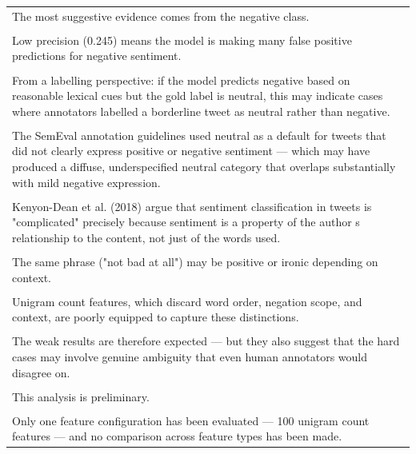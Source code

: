 \documentclass[11pt,a4paper,landscape]{article}
\begin{document}
\begin{longtable}{|p{\dimexpr\linewidth-2\tabcolsep-2\arrayrulewidth\relax}|}
\hline
\rule{0pt}{3.5cm} \\
\hline
The most suggestive evidence comes from the negative class. \\[2pt]
\hline
\rule{0pt}{3.5cm} \\
\hline
Low precision (0.245) means the model is making many false positive predictions for negative sentiment. \\[2pt]
\hline
\rule{0pt}{3.5cm} \\
\hline
From a labelling perspective: if the model predicts negative based on reasonable lexical cues but the gold label is neutral, this may indicate cases where annotators labelled a borderline tweet as neutral rather than negative. \\[2pt]
\hline
\rule{0pt}{3.5cm} \\
\hline
The SemEval annotation guidelines used neutral as a default for tweets that did not clearly express positive or negative sentiment --- which may have produced a diffuse, underspecified neutral category that overlaps substantially with mild negative expression. \\[2pt]
\hline
\rule{0pt}{3.5cm} \\
\hline
Kenyon-Dean et al. (2018) argue that sentiment classification in tweets is "complicated" precisely because sentiment is a property of the author s relationship to the content, not just of the words used. \\[2pt]
\hline
\rule{0pt}{3.5cm} \\
\hline
The same phrase ("not bad at all") may be positive or ironic depending on context. \\[2pt]
\hline
\rule{0pt}{3.5cm} \\
\hline
Unigram count features, which discard word order, negation scope, and context, are poorly equipped to capture these distinctions. \\[2pt]
\hline
\rule{0pt}{3.5cm} \\
\hline
The weak results are therefore expected --- but they also suggest that the hard cases may involve genuine ambiguity that even human annotators would disagree on. \\[2pt]
\hline
\rule{0pt}{3.5cm} \\
\hline
This analysis is preliminary. \\[2pt]
\hline
\rule{0pt}{3.5cm} \\
\hline
Only one feature configuration has been evaluated --- 100 unigram count features --- and no comparison across feature types has been made. \\[2pt]

\end{longtable}
\end{document}
